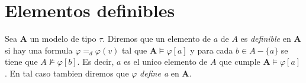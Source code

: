\noproof

\section*{Elementos definibles}
\begin{definition}
Sea $\mathbf{A}$ un modelo de tipo $\tau$. Diremos que un elemento de $a$ de $A$ es \emph{definible} en $\mathbf{A}$
si hay una formula $\varphi =_d \varphi(v)$ tal que $\mathbf{A}\models\varphi[a]$ y para cada $b \in A -\{a\}$ se tiene que
$A\not\models\varphi[b]$. Es decir, $a$ es el unico elemento de $A$ que cumple $\mathbf{A}\models\varphi[a]$. En tal caso
tambien diremos que $\varphi$ \emph{define a} en $\mathbf{A}$.
\end{definition}

